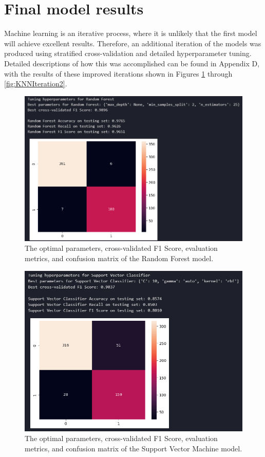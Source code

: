 \documentclass[12pt]{report}
\begin{document}
\section{Final model results}\label{sec:FinalResults}
Machine learning is an iterative process, where it is unlikely that the first model will achieve excellent results.
Therefore, an additional iteration of the models was produced using stratified cross-validation and detailed hyperparameter tuning.
Detailed descriptions of how this was accomplished can be found in Appendix D, with the results of these improved iterations shown 
in Figures \ref{fig:RFIteration2} through \ref{fig:KNNIteration2}.


\begin{figure}[H]
    \centering
    \includegraphics[width=\linewidth]{ModelDev/Iteration2/Results/RF.png}
    \caption{The optimal parameters, cross-validated F1 Score, evaluation metrics, and confusion matrix of the Random Forest model.}
    \label{fig:RFIteration2}
\end{figure}

\begin{figure}[H]
    \centering
    \includegraphics[width=\linewidth]{ModelDev/Iteration2/Results/SVC.png}
    \caption{The optimal parameters, cross-validated F1 Score, evaluation metrics, and confusion matrix of the Support Vector Machine model.}
    \label{fig:SVCIteration2}
\end{figure}
\end{document}

